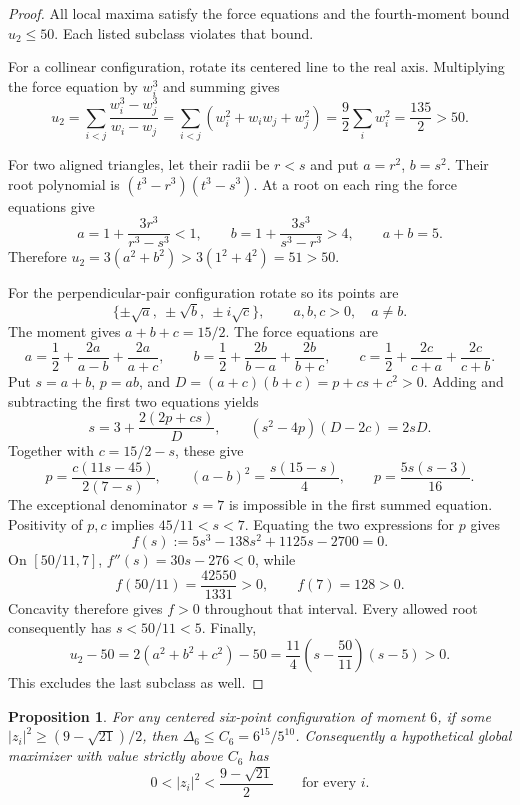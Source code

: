 \documentclass[11pt]{article}
\newtheorem{proposition}[theorem]{Proposition}
\theoremstyle{remark}
\numberwithin{equation}{section}
\begin{document}
\begin{proof}
All local maxima satisfy the force equations and the fourth-moment
bound $u_2\le50$.  Each listed subclass violates that bound.

For a collinear configuration, rotate its centered line to the real
axis.  Multiplying the force equation by $w_i^3$ and summing gives
\[
 u_2=\sum_{i<j}\frac{w_i^3-w_j^3}{w_i-w_j}
 =\sum_{i<j}(w_i^2+w_iw_j+w_j^2)
 =\frac92\sum_iw_i^2=\frac{135}{2}>50.
\]

For two aligned triangles, let their radii be $r<s$ and put
$a=r^2$, $b=s^2$.  Their root polynomial is
$(t^3-r^3)(t^3-s^3)$.  At a root on each ring the force equations give
\[
 a=1+\frac{3r^3}{r^3-s^3}<1,
 \qquad
 b=1+\frac{3s^3}{s^3-r^3}>4,
 \qquad a+b=5.
\]
Therefore $u_2=3(a^2+b^2)>3(1^2+4^2)=51>50$.

For the perpendicular-pair configuration rotate so its points are
\[
 \{\pm\sqrt a,\ \pm\sqrt b,\ \pm i\sqrt c\},
 \qquad a,b,c>0,\quad a\ne b.
\]
The moment gives $a+b+c=15/2$.  The force equations are
\[
 a=\frac12+\frac{2a}{a-b}+\frac{2a}{a+c},\qquad
 b=\frac12+\frac{2b}{b-a}+\frac{2b}{b+c},\qquad
 c=\frac12+\frac{2c}{c+a}+\frac{2c}{c+b}.
\]
Put $s=a+b$, $p=ab$, and $D=(a+c)(b+c)=p+cs+c^2>0$.
Adding and subtracting the first two equations yields
\[
 s=3+\frac{2(2p+cs)}D,
 \qquad (s^2-4p)(D-2c)=2sD.
\]
Together with $c=15/2-s$, these give
\[
 p=\frac{c(11s-45)}{2(7-s)},\qquad
 (a-b)^2=\frac{s(15-s)}4,\qquad
 p=\frac{5s(s-3)}{16}.
\]
The exceptional denominator $s=7$ is impossible in the first
summed equation.  Positivity of $p,c$ implies $45/11<s<7$.
Equating the two expressions for $p$ gives
\[
 f(s):=5s^3-138s^2+1125s-2700=0.
\]
On $[50/11,7]$, $f''(s)=30s-276<0$, while
\[
 f(50/11)=\frac{42550}{1331}>0,\qquad f(7)=128>0.
\]
Concavity therefore gives $f>0$ throughout that interval.
Every allowed root consequently has $s<50/11<5$.
Finally,
\[
 u_2-50
 =2(a^2+b^2+c^2)-50
 =\frac{11}{4}\left(s-\frac{50}{11}\right)(s-5)>0.
\]
This excludes the last subclass as well.
\end{proof}

\begin{proposition}\label{prop:six-large-radius-exclusion}
For any centered six-point configuration of moment $6$, if some
$|z_i|^2\ge(9-\sqrt{21})/2$, then
$\Delta_6\le C_6=6^{15}/5^{10}$.
Consequently a hypothetical global maximizer with value strictly above
$C_6$ has
\[
 0<|z_i|^2<\frac{9-\sqrt{21}}2\qquad\text{for every }i.
\]
\end{proposition}
\end{document}
